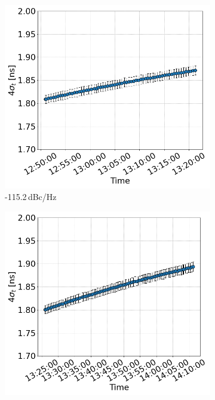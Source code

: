  \begin{figure}[htp]
     \centering
     \begin{subfigure}{.45\textwidth}
         \centering
         \includegraphics[width=.95\linewidth]{images/app_c/bunch_length_COAST_02.png}  
         \caption{-115.2\,dBc/Hz}
     \end{subfigure}
     \begin{subfigure}{.45\textwidth}
         \centering
         \includegraphics[width=.95\linewidth]{images/app_c/bunch_length_COAST_03.png}  

\end{subfigure}
\end{figure}
